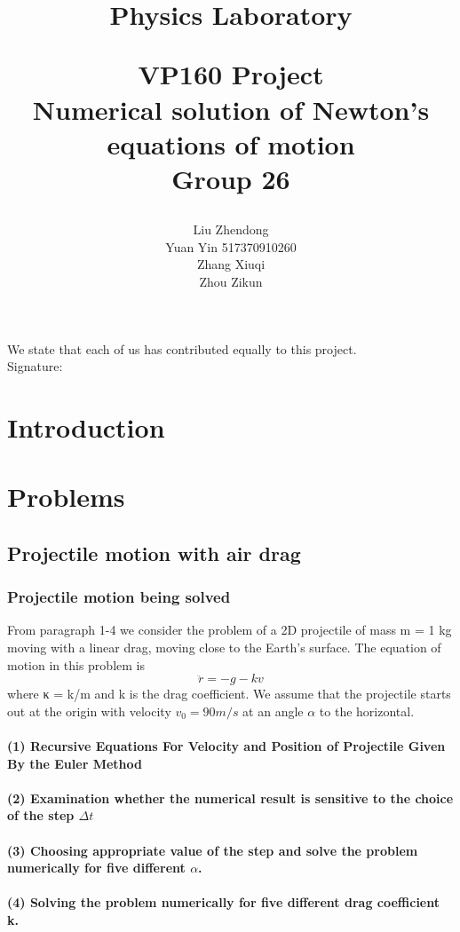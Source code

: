 \documentclass{article}
\title{Physics Laboratory\\[2ex]
\begin{center}
VP160 Project\\
Numerical solution of Newton's equations of motion\\
Group 26
\end{center}
}
\author{Liu Zhendong\\
Yuan Yin 517370910260\\
Zhang Xiuqi\\Zhou Zikun}
\begin{document}
 \maketitle
\begin{center}

We state that each of us has contributed equally to this project.\\
Signature:
\end{center}
\newpage %

\section{Introduction}
\section{Problems}
\subsection{Projectile motion with air drag}
\subsubsection{Projectile motion being solved}
From paragraph 1-4 we consider the problem of a 2D projectile of mass m = 1 kg moving with a linear drag, moving close to the Earth’s surface. The equation of motion in this problem is\\
$$
\ddot{r}=-g-kv
$$
where κ = k/m and k is the drag coefficient. We assume that the projectile starts out at the origin with velocity $v_0 = 90 m/s$ at an angle $\alpha$ to the horizontal.\\
\paragraph{(1) Recursive Equations For Velocity and Position of Projectile Given By the Euler Method}
\paragraph{(2) Examination whether the numerical result is sensitive to the choice of the step $\Delta t$}
\paragraph{(3) Choosing appropriate value of the step and solve the problem numerically for five different $\alpha$.}
\paragraph{(4) Solving the problem numerically for five different drag coefficient k.}
\end{document}
